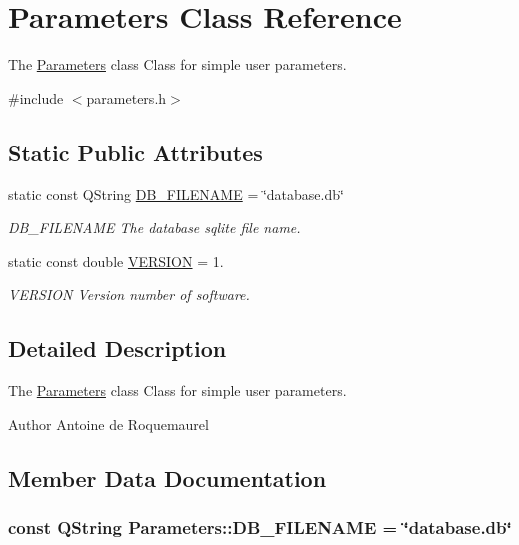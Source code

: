 \hypertarget{classParameters}{\section{Parameters Class Reference}
\label{classParameters}
}


The \hyperlink{classParameters}{Parameters} class Class for simple user parameters.  




{\ttfamily \#include $<$parameters.\-h$>$}

\subsection*{Static Public Attributes}
\begin{DoxyCompactItemize}
\item 
static const Q\-String \hyperlink{classParameters_a80b98bd51d910bcc2203afcacbc7df87}{D\-B\-\_\-\-F\-I\-L\-E\-N\-A\-M\-E} = \char`\"{}database.\-db\char`\"{}
\begin{DoxyCompactList}\small\item\em D\-B\-\_\-\-F\-I\-L\-E\-N\-A\-M\-E The database sqlite file name. \end{DoxyCompactList}\item 
static const double \hyperlink{classParameters_a279ee24140c761de46178daa8960bdc8}{V\-E\-R\-S\-I\-O\-N} = 1.
\begin{DoxyCompactList}\small\item\em V\-E\-R\-S\-I\-O\-N Version number of software. \end{DoxyCompactList}\end{DoxyCompactItemize}


\subsection{Detailed Description}
The \hyperlink{classParameters}{Parameters} class Class for simple user parameters. 

\begin{DoxyAuthor}{Author}
Antoine de Roquemaurel 
\end{DoxyAuthor}


\subsection{Member Data Documentation}
\hypertarget{classParameters_a80b98bd51d910bcc2203afcacbc7df87}{
\subsubsection[{D\-B\-\_\-\-F\-I\-L\-E\-N\-A\-M\-E}]{\setlength{\rightskip}{0pt plus 5cm}const Q\-String Parameters\-::\-D\-B\-\_\-\-F\-I\-L\-E\-N\-A\-M\-E = \char`\"{}database.\-db\char`\"{}\hspace{0.3cm}{\ttfamily [static]}}}\label{classParameters_a80b98bd51d910bcc2203afcacbc7df87}


